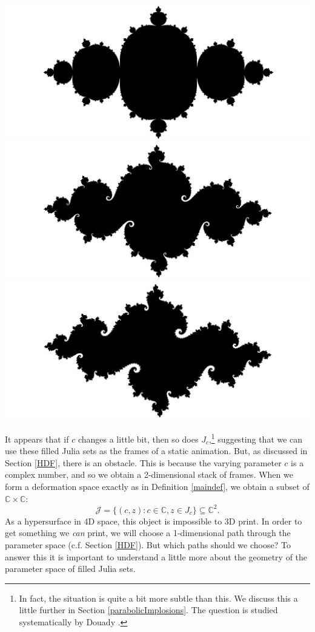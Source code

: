 \documentclass[12 pt]{article}
\newcommand{\bC}{\mathbb{C}}
\newcommand{\cJ}{\mathcal{J}}
\begin{document}
\begin{center}
    \includegraphics[width=.95\textwidth]{images/75Defo_01_cropped.png}
    \includegraphics[width=.95\textwidth]{images/75Defo_02_cropped.png}
    \includegraphics[width=.95\textwidth]{images/75Defo_03_cropped.png}
\end{center}
It appears that if $c$ changes a little bit, then so does $J_c$,\footnote{In fact, the situation is quite a bit more subtle than this.  We discuss this a little further in Section \ref{parabolicImplosions}. The question is studied systematically by Douady \cite{Douady}.} suggesting that we can use these filled Julia sets as the frames of a static animation.  But, as discussed in Section \ref{HDF}, there is an obstacle.   This is because the varying parameter $c$ is a complex number, and so we obtain a 2-dimensional stack of frames.  When we form a deformation space exactly as in Definition \ref{maindef}, we obtain a subset of $\bC\times\bC$:
\[\cJ = \{(c,z):c\in\bC,z\in J_c\}\subseteq\bC^2.\]
As a hypersurface in 4D space, this object is impossible to 3D print.  In order to get something we \textit{can} print, we will choose a 1-dimensional path through the parameter space (c.f. Section \ref{HDF}).  But which paths should we choose?  To answer this it is important to understand a little more about the geometry of the parameter space of filled Julia sets.\\
\end{document}
